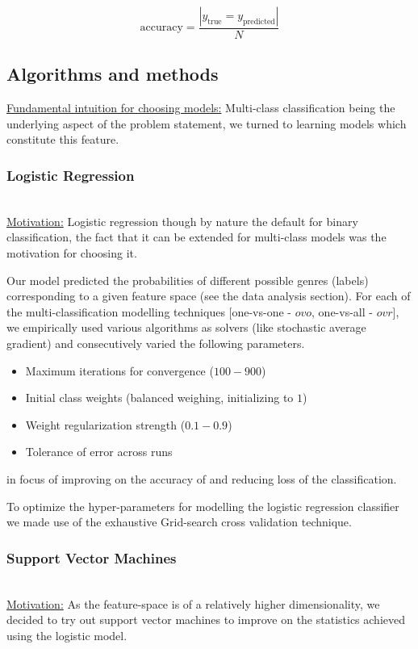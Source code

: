 \documentclass[fleqn,10pt]{SelfArx} %
\begin{document}
\begin{equation} \label{eq:accuracy}
  \text{accuracy} = \frac{| y_{\text{true}} = y_{\text{predicted}}|}{N}
\end{equation}

\subsection{Algorithms and methods}

\underline{Fundamental intuition for choosing models:} Multi-class classification being the underlying aspect of the problem statement, we turned to learning models which constitute this feature.

\subsubsection{Logistic Regression}~\\
\underline{Motivation:} Logistic regression though by nature the default for binary classification, the fact that it can be extended for multi-class models was the motivation for choosing it.

Our model predicted the probabilities of different possible genres (labels) corresponding to a given feature space (see the data analysis section). For each of the multi-classification modelling techniques [one-vs-one - $ovo$, one-vs-all - $ovr$], we empirically used various algorithms as solvers (like stochastic average gradient) and consecutively varied the following parameters.
\begin{itemize}
  \item Maximum iterations for convergence ($100-900$)
  \item Initial class weights (balanced weighing, initializing to $1$)
  \item Weight regularization strength ($0.1-0.9$)
  \item Tolerance of error across runs
\end{itemize}
in focus of improving on the accuracy of and reducing loss of the classification.

To optimize the hyper-parameters for modelling the logistic regression classifier we made use of the exhaustive Grid-search cross validation technique.

\subsubsection{Support Vector Machines}~\\
\underline{Motivation:} As the feature-space is of a relatively higher dimensionality, we decided to try out support vector machines to improve on the statistics achieved using the logistic model.
\end{document}
